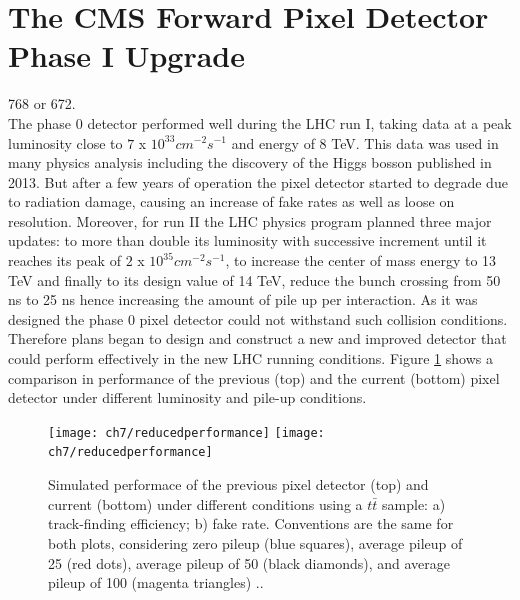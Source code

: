 \section{The CMS Forward Pixel Detector Phase I Upgrade}
{} 768 or 672.\\ 
The phase 0 detector performed well during the LHC run I, taking data at a peak luminosity close to $7$ x $10^{33} cm^{-2} s^{-1}$ and energy of 8 TeV. This data was used in many physics analysis including the discovery of the Higgs bosson published in 2013. But after a few years of operation the pixel detector started to degrade due to radiation damage, causing an increase of fake rates as well as loose on resolution. Moreover, for run II the LHC physics program planned three major updates: to more than double its luminosity with successive increment until it reaches its peak of $2$ x $10^{35} cm^{-2} s^{-1}$, to increase the center of mass energy to 13 TeV and finally to its design value of 14 TeV, reduce the bunch crossing from 50 ns to 25 ns hence increasing the amount of pile up per interaction. As it was designed the phase 0 pixel detector could not withstand such collision conditions. Therefore plans began to design and construct a new and improved detector that could perform effectively in the new LHC running conditions. Figure \ref{redperf} shows a comparison in performance of the previous (top) and the current (bottom) pixel detector under different luminosity  and pile-up conditions. %

\begin{figure}[!h]
	\centering
	\texttt{[image: ch7/reducedperformance]}
	\texttt{[image: ch7/reducedperformance]}
	\caption[Simulated performance comparison of previous and current]{Simulated performace of the previous pixel detector (top) and current (bottom) under different conditions using a $t\bar{t}$ sample: a) track-finding efficiency; b) fake rate. Conventions are the same for both plots, considering zero pileup (blue squares), average pileup of 25 (red dots), average pileup of 50 (black diamonds), and average pileup of 100 (magenta triangles) {}.\cite{pix_tdr}.}
	\label{redperf}
\end{figure}

